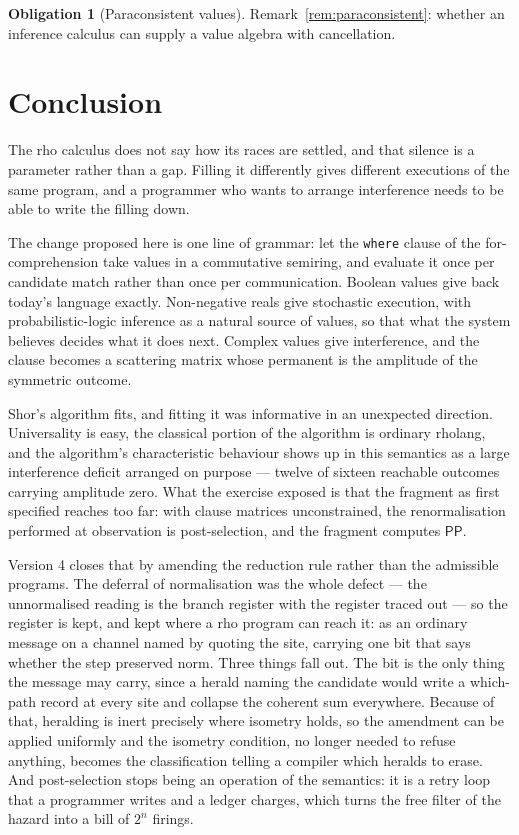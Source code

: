 \documentclass[11pt,a4paper]{article}
\theoremstyle{plain}
\theoremstyle{definition}
\newtheorem{obligation}[theorem]{Obligation}
\theoremstyle{remark}
\begin{document}
\begin{obligation}[Paraconsistent values]\label{ob:para}
Remark~\ref{rem:paraconsistent}: whether an inference calculus can supply a value
algebra with cancellation.
\end{obligation}

\section{Conclusion}\label{sec:conc}

The rho calculus does not say how its races are settled, and that silence is a
parameter rather than a gap. Filling it differently gives different executions of
the same program, and a programmer who wants to arrange interference needs to be
able to write the filling down.

The change proposed here is one line of grammar: let the \texttt{where} clause of
the for-comprehension take values in a commutative semiring, and evaluate it once
per candidate match rather than once per communication. Boolean values give back
today's language exactly. Non-negative reals give stochastic execution, with
probabilistic-logic inference as a natural source of values, so that what the
system believes decides what it does next. Complex values give interference, and
the clause becomes a scattering matrix whose permanent is the amplitude of the
symmetric outcome.

Shor's algorithm fits, and fitting it was informative in an unexpected
direction. Universality is easy, the classical portion of the algorithm is
ordinary rholang, and the algorithm's characteristic behaviour shows up in this
semantics as a large interference deficit arranged on purpose --- twelve of
sixteen reachable outcomes carrying amplitude zero. What the exercise exposed is
that the fragment as first specified reaches too far: with clause matrices
unconstrained, the renormalisation performed at observation is post-selection,
and the fragment computes $\mathsf{PP}$.

Version 4 closes that by amending the reduction rule rather than the admissible
programs. The deferral of normalisation was the whole defect --- the
unnormalised reading is the branch register with the register traced out --- so
the register is kept, and kept where a rho program can reach it: as an ordinary
message on a channel named by quoting the site, carrying one bit that says
whether the step preserved norm. Three things fall out. The bit is the only
thing the message may carry, since a herald naming the candidate would write a
which-path record at every site and collapse the coherent sum everywhere. Because
of that, heralding is inert precisely where isometry holds, so the amendment can
be applied uniformly and the isometry condition, no longer needed to refuse
anything, becomes the classification telling a compiler which heralds to erase.
And post-selection stops being an operation of the semantics: it is a retry loop
that a programmer writes and a ledger charges, which turns the free filter of
the hazard into a bill of $2^n$ firings.
\end{document}
